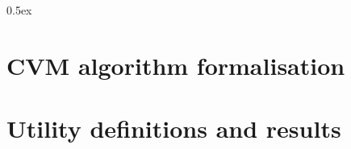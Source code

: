 \documentclass[11pt, a4paper]{report}
\begin{document}
\tableofcontents

\parindent 0pt
\parskip 0.5ex

\chapter{CVM algorithm formalisation}










\chapter{Utility definitions and results}














\end{document}
